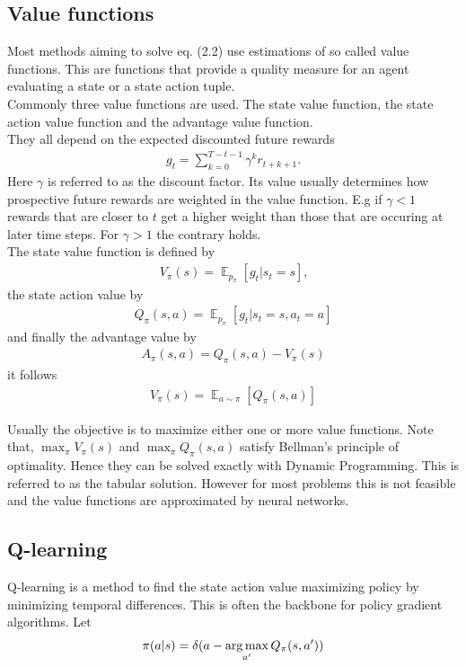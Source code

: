 \subsection{Value functions}
Most methods aiming to solve eq. (2.2) use estimations of so called value functions. This are functions that provide a quality measure for an agent evaluating a state or a state action tuple. \\
Commonly three value functions are used. The state value function, the state action value function and the advantage value function.\\
They all depend on the expected discounted future rewards
\begin{align}
	g_t = \sum^{T-t-1}_{k=0} \gamma^k r_{t+k+1} .
\end{align}
Here $\gamma$ is referred to as the discount factor. Its value usually determines how prospective future rewards are weighted in the value function. E.g if $\gamma<1$ rewards that are closer to $t$ get a higher weight than those that are occuring at later time steps. For $\gamma>1$ the contrary holds.\\
The state value function is defined by
\begin{align}
	V_{\pi}(s) = \mathop{\mathbb{E}}_{p_{\pi}}\left[g_t|s_t=s \right]\text{,}
\end{align}
the state action value by
\begin{align}
	Q_{\pi}(s, a) = \mathop{\mathbb{E}}_{p_{\pi}}\left[g_t|s_t=s, a_t=a \right]
\end{align}
and finally the advantage value by
\begin{align}
	A_{\pi}(s, a) = Q_{\pi}(s, a) - V_{\pi}(s)
\end{align}
it follows
\begin{align}
	V_{\pi}(s) = \mathop{\mathbb{E}}_{a\sim\pi}\left[ Q_{\pi}(s, a)\right]
\end{align}

\noindent Usually the objective is to maximize either one or more value functions.
Note that, $\max_{\pi}V_{\pi}(s)$ and $\max_{\pi}Q_{\pi}(s, a)$ satisfy Bellman's principle of optimality. Hence they can be solved exactly with Dynamic Programming. This is referred to as the tabular solution. However for most problems this is not feasible and the value functions are approximated by neural networks. \\

\subsection{Q-learning}
Q-learning is a method to find the state action value maximizing policy by minimizing temporal differences. This is often the backbone for policy gradient algorithms. Let
\begin{align}
\pi(a|s) = \delta(a - \operatorname*{arg\,max}_{a'}Q_{\pi}(s, a'))
\end{align}

